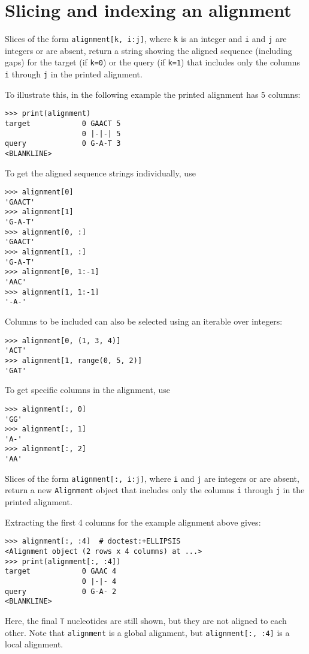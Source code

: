 \section{Slicing and indexing an alignment}

Slices of the form \verb+alignment[k, i:j]+, where \verb+k+ is an integer and \verb+i+ and \verb+j+ are integers or are absent, return a string showing the aligned sequence (including gaps) for the target (if \verb+k=0+) or the query (if \verb+k=1+) that includes only the columns \verb+i+ through \verb+j+ in the printed alignment.

To illustrate this, in the following example the printed alignment has 5 columns:

\begin{verbatim}
>>> print(alignment)
target            0 GAACT 5
                  0 |-|-| 5
query             0 G-A-T 3
<BLANKLINE>
\end{verbatim}

To get the aligned sequence strings individually, use
\begin{verbatim}
>>> alignment[0]
'GAACT'
>>> alignment[1]
'G-A-T'
>>> alignment[0, :]
'GAACT'
>>> alignment[1, :]
'G-A-T'
>>> alignment[0, 1:-1]
'AAC'
>>> alignment[1, 1:-1]
'-A-'
\end{verbatim}

Columns to be included can also be selected using an iterable over integers:
\begin{verbatim}
>>> alignment[0, (1, 3, 4)]
'ACT'
>>> alignment[1, range(0, 5, 2)]
'GAT'
\end{verbatim}

To get specific columns in the alignment, use
\begin{verbatim}
>>> alignment[:, 0]
'GG'
>>> alignment[:, 1]
'A-'
>>> alignment[:, 2]
'AA'
\end{verbatim}

Slices of the form \verb+alignment[:, i:j]+, where \verb+i+ and \verb+j+ are integers or are absent, return a new \verb+Alignment+ object that includes only the columns \verb+i+ through \verb+j+ in the printed alignment.

Extracting the first 4 columns for the example alignment above gives:
\begin{verbatim}
>>> alignment[:, :4]  # doctest:+ELLIPSIS
<Alignment object (2 rows x 4 columns) at ...>
>>> print(alignment[:, :4])
target            0 GAAC 4
                  0 |-|- 4
query             0 G-A- 2
<BLANKLINE>
\end{verbatim}
Here, the final \verb+T+ nucleotides are still shown, but they are not aligned to each other. Note that \verb+alignment+ is a global alignment, but \verb+alignment[:, :4]+ is a local alignment.

